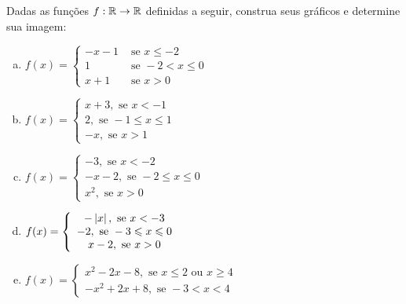\begin{secExercicios}
    \begin{exer}
        Dadas as funções $f:\mathbb{R}\to\mathbb{R}$ definidas a seguir, construa seus gráficos e determine sua imagem:
        \begin{enumerate}[a)]
            \item $f(x) = 
            \left\{\begin{array}{cl}
             -x-1 & \text{ se } x \leq -2 \\
             1 & \text{ se } -2< x \leq 0 \\
             x+1 & \text{ se } x>0
            \end{array}\right.$

            \item $f(x) = 
            \left\{\begin{array}{cl}
             x+3, \text{ se } x <-1 \\
             2, \text{ se } -1 \leq x \leq 1 \\
             -x, \text{ se } x>1
            \end{array}\right.$
            
            \item $f(x) = 
            \left\{\begin{array}{cl}
             -3, \text{ se } x < -2 \\
             -x-2, \text{ se } -2\leq x\leq 0 \\
             x^2, \text{ se } x>0
            \end{array}\right.$
            
            \item $f(x) = 
            \left\{\begin{array}{cl}
             -\left|x\right|, \text{ se } x < -3 \\
             -2, \text{ se } -3\leqslant x\leqslant 0 \\
             x-2, \text{ se } x>0
            \end{array}\right.$

            \item $f(x) = 
            \left\{\begin{array}{cl}
             x^2-2x-8, \text{ se } x \leq 2 \text{ ou } x\geq 4 \\
             -x^2+2x+8, \text{ se } -3< x < 4
            \end{array}\right.$
        \end{enumerate}
    \end{exer}


\end{secExercicios}
